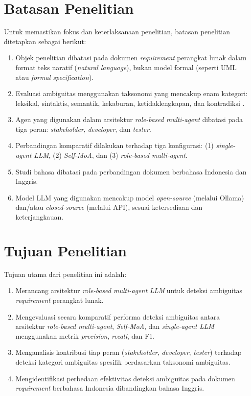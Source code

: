 \section{Batasan Penelitian}
Untuk memastikan fokus dan keterlaksanaan penelitian, batasan penelitian ditetapkan sebagai berikut:
\begin{enumerate}
	\item Objek penelitian dibatasi pada dokumen \textit{requirement} perangkat lunak dalam format teks naratif (\textit{natural language}), bukan model formal (seperti UML atau \textit{formal specification}).
	\item Evaluasi ambiguitas menggunakan taksonomi yang mencakup enam kategori: leksikal, sintaktis, semantik, kekaburan, ketidaklengkapan, dan kontradiksi \cite{berry2004}.
	\item Agen yang digunakan dalam arsitektur \textit{role-based multi-agent} dibatasi pada tiga peran: \textit{stakeholder}, \textit{developer}, dan \textit{tester}.
	\item Perbandingan komparatif dilakukan terhadap tiga konfigurasi: (1) \textit{single-agent LLM}, (2) \textit{Self-MoA}, dan (3) \textit{role-based multi-agent}.
	\item Studi bahasa dibatasi pada perbandingan dokumen berbahasa Indonesia dan Inggris.
	\item Model LLM yang digunakan mencakup model \textit{open-source} (melalui Ollama) dan/atau \textit{closed-source} (melalui API), sesuai ketersediaan dan keterjangkauan.
\end{enumerate}

\section{Tujuan Penelitian}
Tujuan utama dari penelitian ini adalah:
\begin{enumerate}
	\item Merancang arsitektur \textit{role-based multi-agent LLM} untuk deteksi ambiguitas \textit{requirement} perangkat lunak.
	\item Mengevaluasi secara komparatif performa deteksi ambiguitas antara arsitektur \textit{role-based multi-agent}, \textit{Self-MoA}, dan \textit{single-agent LLM} menggunakan metrik \textit{precision}, \textit{recall}, dan F1.
	\item Menganalisis kontribusi tiap peran (\textit{stakeholder}, \textit{developer}, \textit{tester}) terhadap deteksi kategori ambiguitas spesifik berdasarkan taksonomi ambiguitas.
	\item Mengidentifikasi perbedaan efektivitas deteksi ambiguitas pada dokumen \textit{requirement} berbahasa Indonesia dibandingkan bahasa Inggris.
\end{enumerate}

